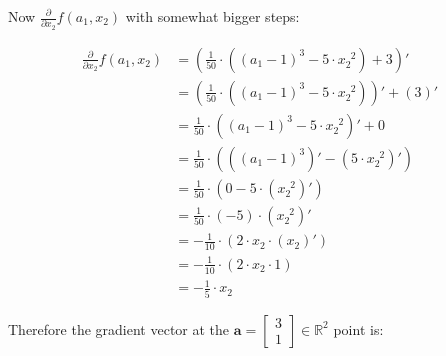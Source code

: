 \documentclass{article}
\begin{document}
            Now $\frac{\partial}{\partial x_2} f(a_1, x_2)$ with somewhat bigger
            steps:

            \begin{align*}
              \frac{\partial}{\partial x_2} f(a_1, x_2)
                & = \left(
                      \frac{1}{50}
                      \cdot
                      \left( (a_1 - 1)^3 - 5 \cdot x_2^{\enspace 2} \right) + 3
                    \right)' \\
                & = \left(
                      \frac{1}{50}
                      \cdot
                      \left( (a_1 - 1)^3 - 5 \cdot x_2^{\enspace 2} \right)
                    \right)'
                    +
                    (3)' \\
                & = \frac{1}{50}
                    \cdot
                    \left( (a_1 - 1)^3 - 5 \cdot x_2^{\enspace 2} \right)'
                    +
                    0 \\
                & = \frac{1}{50}
                    \cdot
                    \left(
                      \left(
                        (a_1 - 1)^3 \right)'
                        - \left(5 \cdot x_2^{\enspace 2} \right)'
                    \right) \\
                & = \frac{1}{50}
                    \cdot
                    \left(
                      0 - 5 \cdot \left( x_2^{\enspace 2} \right)'
                    \right) \\
                & = \frac{1}{50}
                    \cdot
                    (-5)
                    \cdot
                    \left( x_2^{\enspace 2} \right)' \\
                & = - \frac{1}{10}
                    \cdot
                    \left( 2 \cdot x_2 \cdot \left( x_2 \right)' \right) \\
                & = - \frac{1}{10}
                    \cdot
                    \left( 2 \cdot x_2 \cdot 1 \right) \\
                & = - \frac{1}{5} \cdot x_2
            \end{align*}

            Therefore the gradient vector at the
            $\mathbf{a} = \begin{bmatrix}3 \\ 1\end{bmatrix} \in \mathbb{R}^2$
            point is:
\end{document}
